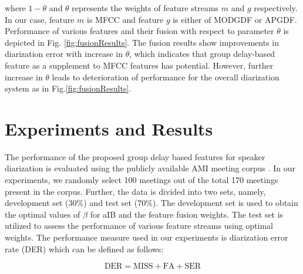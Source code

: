 \documentclass[conference]{IEEEtran}
\begin{document}
where $1-\theta$ and $\theta$ represents the weights of feature streams $m$ and
$g$ respectively. In our case, feature $m$ is MFCC and feature $g$ is either of
MODGDF or APGDF. Performance of various features and their fusion with respect
to parameter $\theta$ is depicted in Fig. \ref{fig:fusionResults}. The fusion
results show improvements in diarization error with increase in $\theta$, which
indicates that group delay-based feature as a supplement to MFCC features has potential. 
However, further increase in $\theta$ leads to deterioration
of performance for the overall diarization system as in Fig.\ref{fig:fusionResults}.   



\section{Experiments and Results }
\label{experimentsNresults}

The performance of the proposed group delay based features for speaker
diarization is evaluated using the publicly available AMI meeting corpus
\cite{AMIData}. In our experiments, we randomly select 100 meetings out of the
total 170 meetings present in the corpus. Further, the data is divided into two
sets, namely, development set ($30\%$) and test set ($70\%$).  The development
set is used to obtain the optimal values of $\beta$ for aIB and the
feature fusion weights. The test set is utilized to assess
the performance of various feature streams using optimal weights. The
performance measure used in our experiments is diarization error rate (DER)
which can be defined as follows: 

\begin{equation}
\text{DER} = \text{MISS} + \text{FA} + \text{SER}
\end{equation}

\end{document}
